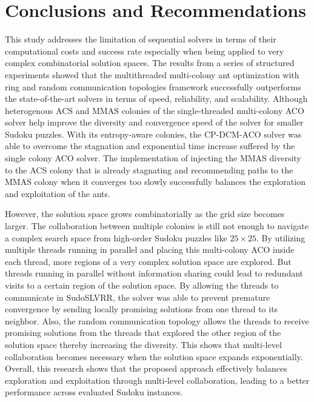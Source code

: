 \chapter{Conclusions and Recommendations} \label{chap:Conclusion}
This study addresses the limitation of sequential solvers in terms of their computational costs and success rate especially when being applied to very complex combinatorial solution spaces. The results from a series of structured experiments showed that the multithreaded multi-colony ant optimization with ring and random communication topologies framework successfully outperforms the state-of-the-art solvers in terms of speed, reliability, and scalability. Although heterogenous ACS and MMAS colonies of the single-threaded multi-colony ACO solver help improve the diversity and convergence speed of the solver for smaller Sudoku puzzles. With its entropy-aware colonies, the CP-DCM-ACO solver was able to overcome the stagnation and exponential time increase suffered by the single colony ACO solver. The implementation of injecting the MMAS diversity to the ACS colony that is already stagnating and recommending paths to the MMAS colony when it converges too slowly successfully balances the exploration and exploitation of the ants. 

However, the solution space grows combinatorially as the grid size becomes larger. The collaboration between multiple colonies is still not enough to navigate a complex search space from high-order Sudoku puzzles like $25\times25$. By utilizing multiple threads running in parallel and placing this multi-colony ACO inside each thread, more regions of a very complex solution space are explored. But threads running in parallel without information sharing could lead to redundant visits to a certain region of the solution space. By allowing the threads to communicate in SudoSLVRR, the solver was able to prevent premature convergence by sending locally promising solutions from one thread to its neighbor. Also, the random communication topology allows the threads to receive promising solutions from the threads that explored the other region of the solution space thereby increasing the diversity. This shows that multi-level collaboration becomes necessary when the solution space expands exponentially. Overall, this research shows that the proposed approach effectively balances exploration and exploitation through multi-level collaboration, leading to a better performance across evaluated Sudoku instances. 

